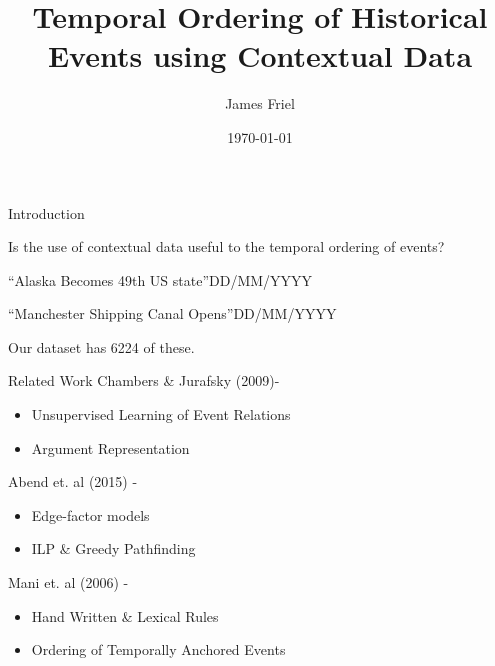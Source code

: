 \documentclass{beamer}
\author{James Friel}
\title{Temporal Ordering of Historical
Events using Contextual Data}
\date{\today}
\begin{document}
\titlepageframe

\begin{tframe}{Introduction}
  \begin{center}

    Is the use of contextual data useful to the temporal ordering of events?\vspace{1em}


    ``Alaska Becomes 49th US state''DD/MM/YYYY\vspace{1em}

    ``Manchester Shipping Canal Opens''DD/MM/YYYY\vspace{4em}
\end{center}
   Our dataset has 6224 of these.
\end{tframe}

\begin{tframe}{Related Work}
  Chambers \& Jurafsky (2009)-
  \begin{itemize}
    \item Unsupervised Learning of Event Relations
    \item Argument Representation
  \end{itemize}
  
  Abend et. al (2015) -
  \begin{itemize}
    \item Edge-factor models
    \item ILP \& Greedy Pathfinding
  \end{itemize}
  
  Mani et. al (2006) - 
  \begin{itemize}
    \item Hand Written \& Lexical Rules
    \item Ordering of Temporally Anchored Events
  \end{itemize}
  
\end{tframe}
\end{document}
